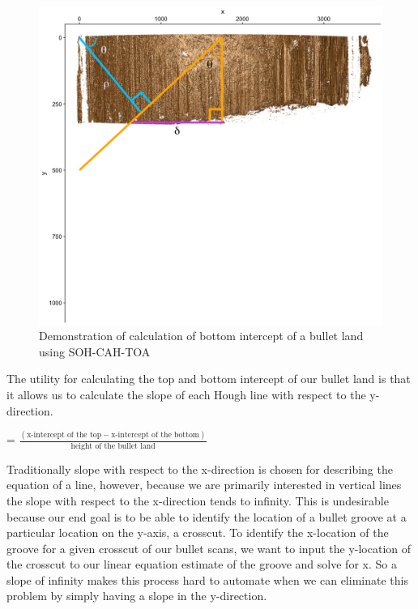 \documentclass[12pt]{article}\usepackage[]{graphicx}\usepackage[]{color}
\newenvironment{knitrout}{}{} %
\theoremstyle{nonumberplain}
\begin{document}
\begin{knitrout}
\color{fgcolor}\begin{figure}

{\centering \includegraphics[width=0.5\linewidth]{../images/calc-xbottom} 

}

\caption[Demonstration of calculation of bottom intercept of a bullet land using SOH-CAH-TOA]{Demonstration of calculation of bottom intercept of a bullet land using SOH-CAH-TOA}\label{fig:xbottom-graphic-inclusion}
\end{figure}


\end{knitrout}

The utility for calculating the top and bottom intercept of our bullet land is that it allows us to calculate the slope of each Hough line with respect to the y-direction. 
\begin{center}
 = $\frac{(\text{x-intercept of the top} - \text{x-intercept of the bottom})}{\text{height of the bullet land}}$
\end{center}

Traditionally slope with respect to the x-direction is chosen for describing the equation of a line, however, because we are primarily interested in vertical lines the slope with respect to the x-direction tends to infinity. This is undesirable because our end goal is to be able to identify the location of a bullet groove at a particular location on the y-axis, a crosscut. To identify the x-location of the groove for a given crosscut of our bullet scans, we want to input the y-location of the crosscut to our linear equation estimate of the groove and solve for x. So a slope of infinity makes this process hard to automate when we can eliminate this problem by simply having a slope in the y-direction. 
\end{document}
